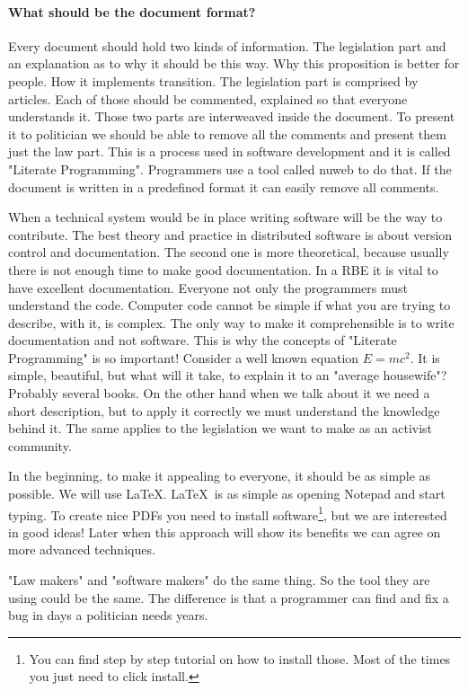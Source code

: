 \documentclass{article}
\begin{document}
\paragraph{What should be the document format?}
Every document should hold two kinds of information.
The legislation part and an explanation as to why it should be this way.
Why this proposition is better for people.
How it implements transition.
The legislation part is comprised by articles.
Each of those should be commented, explained so that everyone understands it.
Those two parts are interweaved inside the document.
To present it to politician we should be able to remove all the comments and present them just the law part.
This is a process used in software development and it is called "Literate Programming".
Programmers use a tool called nuweb\cite{nuweb} to do that.
If the document is written in a predefined format it can easily remove all comments.

When a technical system would be in place writing software will be the way to contribute.
The best theory and practice in distributed software is about version control and documentation.
The second one is more theoretical, because usually there is not enough time to make good documentation.
In a RBE it is vital to have excellent documentation.
Everyone not only the programmers must understand the code.
Computer code cannot be simple if what you are trying to describe, with it, is complex.
The only way to make it comprehensible is to write documentation and not software.
This is why the concepts of "Literate Programming" is so important!
Consider a well known equation $E=mc^2$.
It is simple, beautiful, but what will it take, to explain it to an "average housewife"?
Probably several books.
On the other hand when we talk about it we need a short description, but to apply it correctly we must understand the knowledge behind it.
The same applies to the legislation we want to make as an activist community.

In the beginning, to make it appealing to everyone, it should be as simple as possible.
We will use \LaTeX.
\LaTeX~is as simple as opening Notepad and start typing.
To create nice PDFs you need to install software\footnote{You can find step by step tutorial on how to install those. Most of the times you just need to click install.}, but we are interested in good ideas!
Later when this approach will show its benefits we can agree on more advanced techniques.

"Law makers" and "software makers" do the same thing.
So the tool they are using could be the same.
The difference is that a programmer can find and fix a bug in days a politician needs years.
\end{document}
